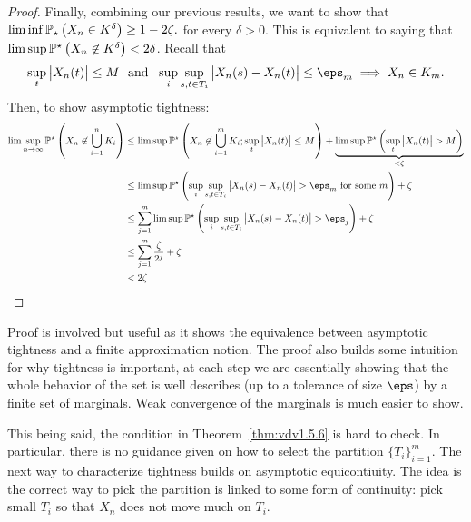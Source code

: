 \begin{proof}
	Finally, combining our previous results, we want to show that
	\(
	    \liminf\P_\star\left(X_n\in K^\delta\right)\geq 1- 2\zeta
		.\) 
	for every \(\delta >0\). This is equivalent to saying that  \(\lim\sup \P^\star\left(X_n\not\in K^\delta\right)<2\delta\). Recall that
	\[
		\sup_t \left|X_n(t)\right| \leq  M\andbox \sup_i\sup_{s,t\in T_i} \left|X_n(s)-X_n(t)\right| \leq \eps_m \implies X_n \in K_m 
	.\]
	Then, to show asymptotic tightness:
	\begin{align*}
		\lim\sup_{n\to\infty} \P^\star\left(X_n\not\in \bigcup_{i=1}^n K_i\right) 
		&\leq \lim\sup \P^\star\left(X_n \not\in \bigcup_{i=1}^mK_i;\sup_t\left|X_n(t)\right|\leq M\right) + \underbrace{\lim\sup \P^\star\left(\sup_t \left|X_n(t)\right|>M\right)}_{<\zeta}\\
		&\leq \lim\sup \P^\star\left(\sup_{i}\sup_{s,t\in T_i}\left|X_n(s)-X_n(t)\right|>\eps_m\text{ for some }m\right)+\zeta \\
		&\leq \sum_{j=1}^m \lim\sup \P^\star\left(\sup_i\sup_{s,t\in T_i}\left|X_n(s)-X_n(t)\right|>\eps_j\right)+\zeta \\
		&\leq  \sum_{j=1}^m \frac{\zeta}{2^j} + \zeta \\
		&< 2\zeta
	\end{align*}
\end{proof}

Proof is involved but useful as it shows the equivalence between asymptotic tightness and a finite approximation notion. The proof also builds some intuition for why tightness is important, at each step we are essentially showing that the whole behavior of the set is well describes (up to a tolerance of size \(\eps\)) by a finite set of marginals. Weak convergence of the marginals is much easier to show.

This being said, the condition in Theorem~\ref{thm:vdv1.5.6} is hard to check. In particular, there is no guidance given on how to select the partition \(\{T_i\}_{i=1}^m\). The next way to characterize tightness builds on asymptotic equicontiuity. The idea is the correct way to pick the partition is linked to some form of continuity: pick small \(T_i\) so that  \(X_n\) does not move much on \(T_i\). 

